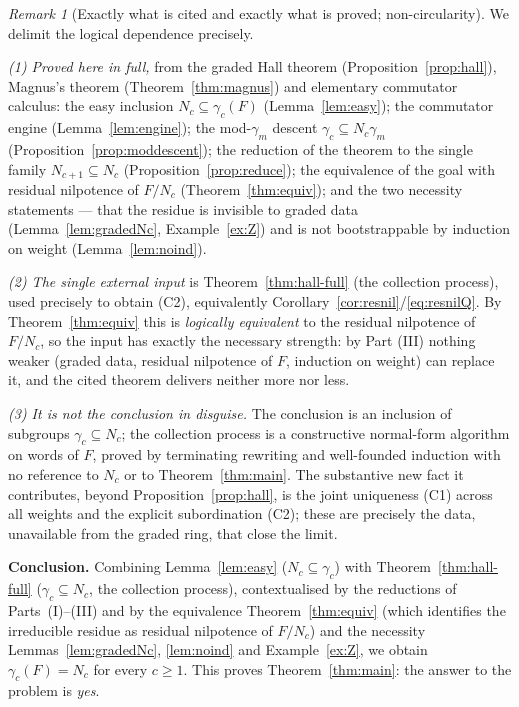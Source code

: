 \documentclass{amsart}
\theoremstyle{definition}
\theoremstyle{remark}
\newtheorem{remark}{Remark}
\begin{document}
\begin{remark}[Exactly what is cited and exactly what is proved; non-circularity]
\label{rem:noncircular}
We delimit the logical dependence precisely.

\emph{(1) Proved here in full,} from the graded Hall theorem
(Proposition~\ref{prop:hall}), Magnus's theorem (Theorem~\ref{thm:magnus}) and
elementary commutator calculus: the easy inclusion $N_c\subseteq\gamma_c(F)$
(Lemma~\ref{lem:easy}); the commutator engine (Lemma~\ref{lem:engine}); the
mod-$\gamma_m$ descent $\gamma_c\subseteq N_c\gamma_m$
(Proposition~\ref{prop:moddescent}); the reduction of the theorem to the single
family $N_{c+1}\subseteq N_c$ (Proposition~\ref{prop:reduce}); the equivalence of
the goal with residual nilpotence of $F/N_c$ (Theorem~\ref{thm:equiv}); and the two
necessity statements --- that the residue is invisible to graded data
(Lemma~\ref{lem:gradedNc}, Example~\ref{ex:Z}) and is not bootstrappable by
induction on weight (Lemma~\ref{lem:noind}).

\emph{(2) The single external input} is Theorem~\ref{thm:hall-full} (the collection
process), used precisely to obtain (C2), equivalently
Corollary~\ref{cor:resnil}/\eqref{eq:resnilQ}. By Theorem~\ref{thm:equiv} this is
\emph{logically equivalent} to the residual nilpotence of $F/N_c$, so the input has
exactly the necessary strength: by Part (III) nothing weaker (graded data, residual
nilpotence of $F$, induction on weight) can replace it, and the cited theorem
delivers neither more nor less.

\emph{(3) It is not the conclusion in disguise.} The conclusion is an inclusion of
subgroups $\gamma_c\subseteq N_c$; the collection process is a constructive
normal-form algorithm on words of $F$, proved by terminating rewriting and
well-founded induction with no reference to $N_c$ or to Theorem~\ref{thm:main}. The
substantive new fact it contributes, beyond Proposition~\ref{prop:hall}, is the
joint uniqueness (C1) across all weights and the explicit subordination (C2); these
are precisely the data, unavailable from the graded ring, that close the limit.
\end{remark}

\bigskip
\noindent\textbf{Conclusion.}
Combining Lemma~\ref{lem:easy} ($N_c\subseteq\gamma_c$) with
Theorem~\ref{thm:hall-full} ($\gamma_c\subseteq N_c$, the collection process),
contextualised by the reductions of Parts~(I)--(III) and by the equivalence
Theorem~\ref{thm:equiv} (which identifies the irreducible residue as residual
nilpotence of $F/N_c$) and the necessity Lemmas~\ref{lem:gradedNc},
\ref{lem:noind} and Example~\ref{ex:Z}, we obtain $\gamma_c(F)=N_c$ for every
$c\ge1$. This proves Theorem~\ref{thm:main}: the answer to the problem is
\emph{yes}.
\end{document}
